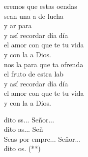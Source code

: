 \documentclass[12pt]{article}
\begin{document}
\begin{multicols*}{2}
\begin{cancion}%
	eremos que estas oendas \\
	sean una a de lucha \\
	y ar para \\
	y así recordar día día \\
	el amor con que te tu vida \\
	y con la a Dios.\\
	nos la  para que ta ofrenda \\
	 el fruto de estra lab\\
	y así recordar día día \\
	el amor con que te tu vida\\
	y con la a Dios.\\
	\begin{chorus}%
	dito ss... Señor...\\
	dito as... Señ\\
	Seas por empre... Señor...\\
	dito os. (**)\\
	\end{chorus}%
\end{cancion}%


\end{multicols*}
\end{document}
